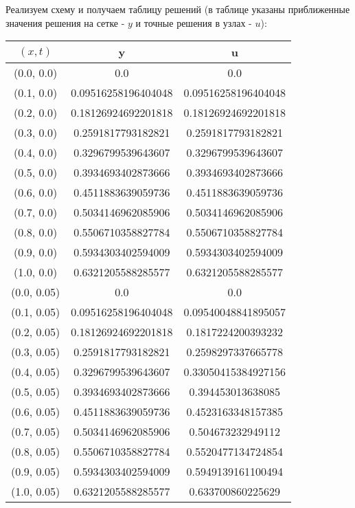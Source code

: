 Реализуем схему и получаем таблицу решений (в таблице указаны приближенные значения решения на сетке - $y$ и точные решения в узлах - $u$):
\tiny
\begin{table}[H]
\begin{tabular}{|c|c|c|}
\hline
$(x,t)$ &  y & u \\
\hline
(0.0, 0.0) & 0.0 & 0.0 \\
\hline
(0.1, 0.0) & 0.09516258196404048 & 0.09516258196404048 \\
\hline
(0.2, 0.0) & 0.18126924692201818 & 0.18126924692201818 \\
\hline
(0.3, 0.0) & 0.2591817793182821 & 0.2591817793182821 \\
\hline
(0.4, 0.0) & 0.3296799539643607 & 0.3296799539643607 \\
\hline
(0.5, 0.0) & 0.3934693402873666 & 0.3934693402873666 \\
\hline
(0.6, 0.0) & 0.4511883639059736 & 0.4511883639059736 \\
\hline
(0.7, 0.0) & 0.5034146962085906 & 0.5034146962085906 \\
\hline
(0.8, 0.0) & 0.5506710358827784 & 0.5506710358827784 \\
\hline
(0.9, 0.0) & 0.5934303402594009 & 0.5934303402594009 \\
\hline
(1.0, 0.0) & 0.6321205588285577 & 0.6321205588285577 \\
\hline
\hline
(0.0, 0.05) & 0.0 & 0.0 \\
\hline
(0.1, 0.05) & 0.09516258196404048 & 0.09540048841895057 \\
\hline
(0.2, 0.05) & 0.18126924692201818 & 0.1817224200393232 \\
\hline
(0.3, 0.05) & 0.2591817793182821 & 0.2598297337665778 \\
\hline
(0.4, 0.05) & 0.3296799539643607 & 0.33050415384927156 \\
\hline
(0.5, 0.05) & 0.3934693402873666 & 0.394453013638085 \\
\hline
(0.6, 0.05) & 0.4511883639059736 & 0.4523163348157385 \\
\hline
(0.7, 0.05) & 0.5034146962085906 & 0.504673232949112 \\
\hline
(0.8, 0.05) & 0.5506710358827784 & 0.5520477134724854 \\
\hline
(0.9, 0.05) & 0.5934303402594009 & 0.5949139161100494 \\
\hline
(1.0, 0.05) & 0.6321205588285577 & 0.633700860225629 \\
\hline
\hline

\end{tabular}
\end{table}

